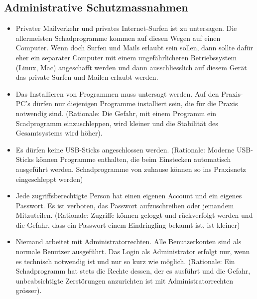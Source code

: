 \documentclass[a4paper]{scrartcl}
\begin{document}
\subsection{Administrative Schutzmassnahmen}
\begin{itemize}
\item     Privater Mailverkehr und privates Internet-Surfen ist zu untersagen. Die allermeisten Schadprogramme kommen auf diesen Wegen auf einen Computer. Wenn doch Surfen und Mails erlaubt sein sollen, dann sollte dafür eher ein separater Computer mit einem ungefährlicheren Betriebssystem (Linux, Mac) angeschafft werden und dann ausschliesslich auf diesem Gerät das private Surfen und Mailen erlaubt werden.

\item Das Installieren von Programmen muss untersagt werden. Auf den Praxis-PC's dürfen nur diejenigen Programme installiert sein, die für die Praxis notwendig sind. (Rationale: Die Gefahr, mit einem Programm ein Scadprogramm einzuschleppen, wird kleiner und die Stabilität des Gesamtsystems wird höher).

\item Es dürfen keine USB-Sticks angeschlossen werden. (Rationale: Moderne USB-Sticks können Programme enthalten, die beim Einstecken automatisch ausgeführt werden. Schadprogramme von zuhause können so ins Praxisnetz eingeschleppt werden)
    
    \item Jede zugriffsberechtigte Person hat einen eigenen Account und ein eigenes Passwort. Es ist verboten, das Passwort aufzuschreiben oder jemandem Mitzuteilen. (Rationale: Zugriffe können geloggt und rückverfolgt werden und die Gefahr, dass ein Passwort einem Eindringling bekannt ist, ist kleiner)
    \item Niemand arbeitet mit Administratorrechten. Alle Benutzerkonten sind als normale Benutzer ausgeführt. Das Login als Administrator erfolgt nur, wenn es technisch notwendig ist und nur so kurz wie möglich. (Rationale: Ein Schadprogramm hat stets die Rechte dessen, der es ausführt und die Gefahr, unbeabsichtigte Zerstörungen anzurichten ist mit Administratorrechten grösser).
        

\end{itemize}
\end{document}
